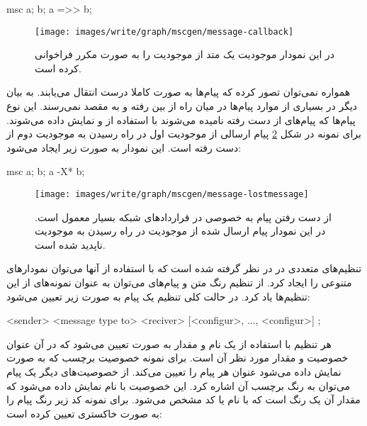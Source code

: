 \begin{MSC}
msc{
	a;
	b;
	a =>> b;
}
\end{MSC}

\begin{figure}[h]
\centering
\texttt{[image: images/write/graph/mscgen/message-callback]}
\caption[فراخوانی مکرر یک متد]{
	در این نمودار موجودیت  یک متد از موجودیت  را به صورت مکرر فراخوانی
	کرده است.
	}
\label{write/graph/mscgen/message-callback}
\end{figure}

همواره نمی‌توان تصور کرده که پیام‌ها به صورت کاملا درست انتقال می‌یابند. به بیان
دیگر در بسیاری از موارد پیام‌ها در میان راه از بین رفته و به مقصد نمی‌رسند. این
نوع پیام‌ها که پیام‌های از دست رفته نامیده می‌شوند با استفاده از   و
 نمایش داده می‌شوند. برای نمونه در شکل
\ref{write/graph/mscgen/message-lostmessage} پیام ارسالی از موجودیت اول در راه
رسیدن به موجودیت دوم از دست رفته است. این نمودار به صورت زیر ایجاد می‌شود:

\begin{MSC}
msc{
	a;
	b;
	a -X* b;
}
\end{MSC}

\begin{figure}[h]
\centering
\texttt{[image: images/write/graph/mscgen/message-lostmessage]}
\caption[از دست رفتن یک پیام]{
	از دست رفتن پیام به خصوصی در قراردادهای شبکه بسیار معمول است. در این نمودار
	پیام ارسال شده از موجودیت  در راه رسیدن به موجودیت  ناپدید شده است.
	}
\label{write/graph/mscgen/message-lostmessage}
\end{figure}

تنظیم‌های متعددی در  در نظر گرفته شده است که با استفاده از آنها
می‌توان نمودارهای متنوعی را ایجاد کرد. از تنظیم رنگ متن و پیام‌های می‌توان به
عنوان نمونه‌های از این تنظیم‌ها یاد کرد. در حالت کلی تنظیم یک پیام به صورت زیر
تعیین می‌شود:

\begin{MSC}
<sender> <message type to> <reciver> [<configur>, ..., <configur>]  ;
\end{MSC}

هر تنظیم با استفاده از یک نام و مقدار به صورت  تعیین می‌شود که در
آن  عنوان خصوصیت و  مقدار مورد نظر آن است. برای نمونه خصوصیت
برچسب که به صورت  نمایش داده می‌شود عنوان هر پیام را تعیین می‌کند. از
خصوصیت‌های دیگر یک پیام می‌توان به رنگ برچسب آن اشاره کرد. این خصوصیت با نام
 نمایش داده می‌شود که مقدار آن یک رنگ است که با نام یا کد مشخص
می‌شود. برای نمونه کد زیر رنگ پیام را به صورت خاکستری تعیین کرده است:

